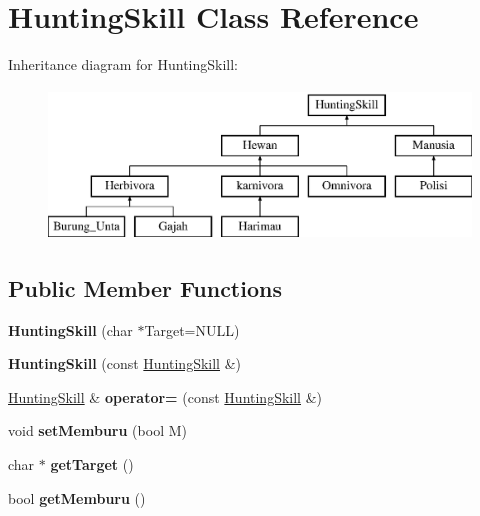 \hypertarget{class_hunting_skill}{}\section{Hunting\+Skill Class Reference}
\label{class_hunting_skill}
Inheritance diagram for Hunting\+Skill\+:\begin{figure}[H]
\begin{center}
\leavevmode
\includegraphics[height=4.000000cm]{class_hunting_skill}
\end{center}
\end{figure}
\subsection*{Public Member Functions}
\begin{DoxyCompactItemize}
\item 
{\bfseries Hunting\+Skill} (char $\ast$Target=N\+U\+LL)\hypertarget{class_hunting_skill_abca94691ed5e1dd038ce02a70e71254d}{}\label{class_hunting_skill_abca94691ed5e1dd038ce02a70e71254d}

\item 
{\bfseries Hunting\+Skill} (const \hyperlink{class_hunting_skill}{Hunting\+Skill} \&)\hypertarget{class_hunting_skill_a8817bc85912e00b4b431a94f32ee494e}{}\label{class_hunting_skill_a8817bc85912e00b4b431a94f32ee494e}

\item 
\hyperlink{class_hunting_skill}{Hunting\+Skill} \& {\bfseries operator=} (const \hyperlink{class_hunting_skill}{Hunting\+Skill} \&)\hypertarget{class_hunting_skill_abd3b1e20a12499d97eb24f428be09d2d}{}\label{class_hunting_skill_abd3b1e20a12499d97eb24f428be09d2d}

\item 
void {\bfseries set\+Memburu} (bool M)\hypertarget{class_hunting_skill_a9e00e9c4f2548ab4d25acb513625e364}{}\label{class_hunting_skill_a9e00e9c4f2548ab4d25acb513625e364}

\item 
char $\ast$ {\bfseries get\+Target} ()\hypertarget{class_hunting_skill_ace96396eca2bb39cddd326c2dc22243c}{}\label{class_hunting_skill_ace96396eca2bb39cddd326c2dc22243c}

\item 
bool {\bfseries get\+Memburu} ()\hypertarget{class_hunting_skill_a1556fa4584ab19e2887e448fe5f6d34f}{}\label{class_hunting_skill_a1556fa4584ab19e2887e448fe5f6d34f}

\end{DoxyCompactItemize}


